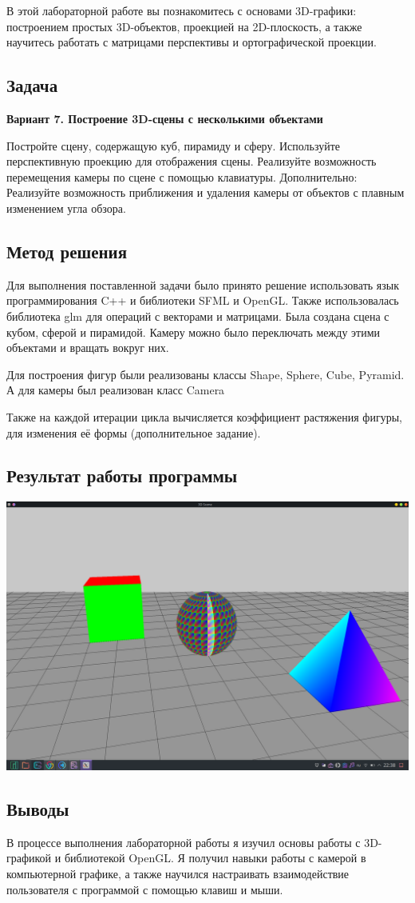 \documentclass[12pt]{article}
\begin{document}
В этой лабораторной работе вы познакомитесь с основами 3D-графики: построением
простых 3D-объектов, проекцией на 2D-плоскость, а также научитесь работать с матрицами
перспективы и ортографической проекции.

\subsection*{Задача}

\textbf{Вариант 7. Построение 3D-сцены с несколькими объектами}

Постройте сцену, содержащую куб, пирамиду и сферу.
Используйте перспективную проекцию для отображения сцены.
Реализуйте возможность перемещения камеры по сцене с помощью клавиатуры.
Дополнительно: Реализуйте возможность приближения и удаления камеры от объектов с
плавным изменением угла обзора.

\subsection*{Метод решения}

Для выполнения поставленной задачи было принято решение использовать
язык программирования C++ и библиотеки SFML и OpenGL.
Также использовалась библиотека glm для операций с векторами и матрицами.
Была создана сцена с кубом, сферой и пирамидой.
Камеру можно было переключать между этими объектами и вращать вокруг них.

Для построения фигур были реализованы классы Shape, Sphere, Cube, Pyramid.
А для камеры был реализован класс Camera

Также на каждой итерации цикла вычисляется коэффициент растяжения фигуры,
для изменения её формы (дополнительное задание).

\subsection*{Результат работы программы}

\includegraphics[width=15cm]{demo.png}

\subsection*{Выводы}

В процессе выполнения лабораторной работы я изучил основы работы с 3D-графикой
и библиотекой OpenGL. Я получил навыки работы с камерой в компьютерной графике, а также
научился настраивать взаимодействие пользователя с программой с помощью клавиш и мыши.
\end{document}

